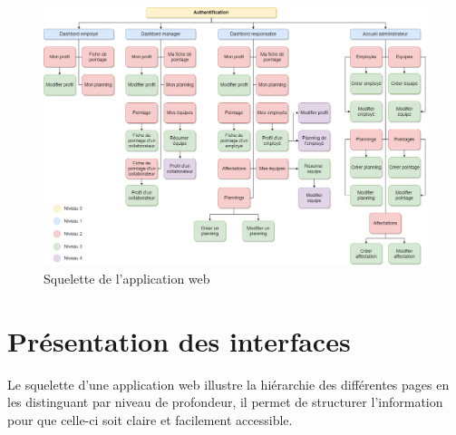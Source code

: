 \clearpage
\thispagestyle{empty}
\begin{landscape}
      \begin{figure}[h!]
          \centering
          \includegraphics[scale=0.44 ]{images/interface/arbre.png}
          \caption{Squelette de l'application web}
          \label{fig90}
      \end{figure}  
\end{landscape}

\clearpage
    
\section{Présentation des interfaces}
Le squelette d’une application web  illustre la hiérarchie des différentes pages 
en les distinguant par niveau de profondeur, il permet de structurer 
l’information pour que celle-ci soit claire et facilement accessible.

